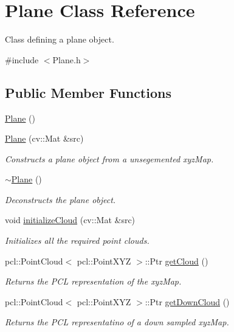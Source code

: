 \hypertarget{class_plane}{}\section{Plane Class Reference}
\label{class_plane}


Class defining a plane object.  




{\ttfamily \#include $<$Plane.\+h$>$}

\subsection*{Public Member Functions}
\begin{DoxyCompactItemize}
\item 
\hyperlink{class_plane_acac0d9c003e0ab10d07b146c3566a0c7}{Plane} ()
\item 
\hyperlink{class_plane_a94bc1ca29c305edb76676528b1a9465c}{Plane} (cv\+::\+Mat \&src)
\begin{DoxyCompactList}\small\item\em Constructs a plane object from a unsegemented xyz\+Map. \end{DoxyCompactList}\item 
\hyperlink{class_plane_a69abd86051c880dcb44b249ad10c4436}{$\sim$\+Plane} ()
\begin{DoxyCompactList}\small\item\em Deconstructs the plane object. \end{DoxyCompactList}\item 
void \hyperlink{class_plane_ab884c9687d63290912707f749adad115}{initialize\+Cloud} (cv\+::\+Mat \&src)
\begin{DoxyCompactList}\small\item\em Initializes all the required point clouds. \end{DoxyCompactList}\item 
pcl\+::\+Point\+Cloud$<$ pcl\+::\+Point\+X\+YZ $>$\+::Ptr \hyperlink{class_plane_a89c277f419ffb0e9d53f29127109465b}{get\+Cloud} ()
\begin{DoxyCompactList}\small\item\em Returns the P\+CL representation of the xyz\+Map. \end{DoxyCompactList}\item 
pcl\+::\+Point\+Cloud$<$ pcl\+::\+Point\+X\+YZ $>$\+::Ptr \hyperlink{class_plane_abad6f7c26005ad7ab847af5acaad9c31}{get\+Down\+Cloud} ()
\begin{DoxyCompactList}\small\item\em Returns the P\+CL representatino of a down sampled xyz\+Map. \end{DoxyCompactList}\item 

\end{DoxyCompactItemize}
